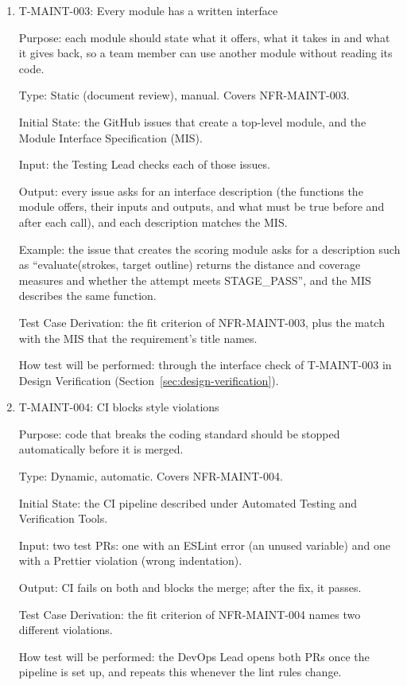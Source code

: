 \documentclass[12pt, titlepage]{article}
\newcommand{\testitem}[1]{\item #1\par\nopagebreak}
\begin{document}
\begin{enumerate}
Output: each module is found within \texttt{LOCATE\_TIME\_MAX}.

Test Case Derivation: the fit criterion of NFR-MAINT-002.

How test will be performed: once, at Rev~0, taking about 15 minutes; any
question that takes longer becomes an issue to improve the MG or the module
names.

\testitem{T-MAINT-003: Every module has a written interface}

Purpose: each module should state what it offers, what it takes in and
what it gives back, so a team member can use another module without
reading its code.

Type: Static (document review), manual. Covers NFR-MAINT-003.

Initial State: the GitHub issues that create a top-level module, and the
Module Interface Specification (MIS).

Input: the Testing Lead checks each of those issues.

Output: every issue asks for an interface description (the functions the
module offers, their inputs and outputs, and what must be true before and
after each call), and each description matches the MIS.

Example: the issue that creates the scoring module asks for a description
such as ``evaluate(strokes, target outline) returns the distance and coverage
measures and whether the attempt meets STAGE\_PASS'',
and the MIS describes the same function.

Test Case Derivation: the fit criterion of NFR-MAINT-003, plus the match
with the MIS that the requirement's title names.

How test will be performed: through the interface check of T-MAINT-003 in
Design Verification (Section~\ref{sec:design-verification}).

\testitem{T-MAINT-004: CI blocks style violations}

Purpose: code that breaks the coding standard should be stopped automatically before it is merged.

Type: Dynamic, automatic. Covers NFR-MAINT-004.

Initial State: the CI pipeline described under Automated Testing and Verification Tools.

Input: two test PRs: one with an ESLint error (an unused variable) and
one with a Prettier violation (wrong indentation).

Output: CI fails on both and blocks the merge; after the fix, it passes.

Test Case Derivation: the fit criterion of NFR-MAINT-004 names two
different violations.

How test will be performed: the DevOps Lead opens both PRs once the
pipeline is set up, and repeats this whenever the lint rules change.

\end{enumerate}
\end{document}
